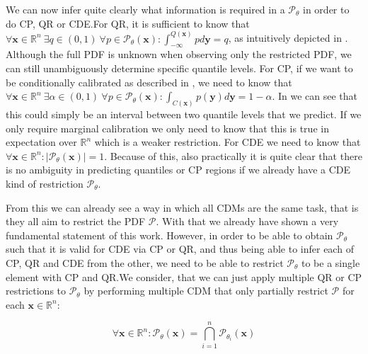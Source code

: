 We can now infer quite clearly what information is required in a $\mathscr{P}_{\theta}$ in order to do CP, QR or CDE.\@ For QR, it is sufficient to know that
$\forall \mathbf{x} \in \mathbb{R}^n\ \exists q \in (0,1)\ \forall p\in \mathscr{P}_{\theta}(\mathbf{x}): \int_{-\infty}^{Q(\mathbf{x})} p d\mathbf{y} = q$, as intuitively depicted in . Although the full PDF is unknown when observing only the restricted PDF, we can still unambiguously determine specific quantile levels. For CP, if we want to be conditionally calibrated as described in , we need to know that $\forall \mathbf{x} \in \mathbb{R}^n\ \exists \alpha \in (0,1)\ \forall p\in \mathscr{P}_{\theta}(\mathbf{x}): \int_{C(\mathbf{x})} p(\mathbf{y}) d\mathbf{y} = 1 - \alpha$. In  we can see that this could simply be an interval between two quantile levels that we predict. If we only require marginal calibration we only need to know that this is true in expectation over $\mathbb{R}^n$ which is a weaker restriction. For CDE we need to know that $\forall \mathbf{x} \in \mathbb{R}^n: |\mathscr{P}_{\theta}(\mathbf{x})| = 1$. Because of this, also practically it is quite clear that there is no ambiguity in predicting quantiles or CP regions if we already have a CDE kind of restriction $\mathscr{P}_\theta$.

From this we can already see a way in which all CDMs are the same task, that is they all aim to restrict the PDF $\mathcal{P}$. With that we already have shown a very fundamental statement of this work. However, in order to be able to obtain $\mathscr{P}_\theta$ such that it is valid for CDE via CP or QR, and thus being able to infer each of CP, QR and CDE from the other, we need to be able to restrict $\mathscr{P}_\theta$ to be a single element with CP and QR.\@ We consider, that we can just apply multiple QR or CP restrictions to $\mathscr{P}_\theta$ by performing multiple CDM that only partially restrict $\mathcal{P}$ for each $\mathbf{x}\in\mathbb{R}^n$:

\begin{equation}
    \forall \mathbf{x}\in\mathbb{R}^n: \mathscr{P}_{\theta}(\mathbf{x}) = \bigcap_{i=1}^n \mathscr{P}_{\theta_i}(\mathbf{x})
\end{equation}

